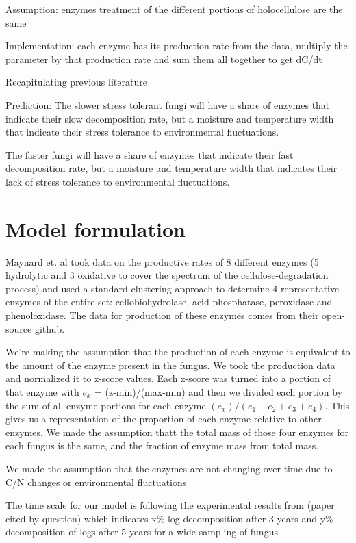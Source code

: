\documentclass[12pt]{article}
\begin{document}
\begin{multicols}{2}
Assumption: enzymes treatment of the different portions of holocellulose are the same 

Implementation: each enzyme has its production rate from the data, multiply the parameter by that production rate and sum them all together to get dC/dt

Recapitulating previous literature


Prediction:
The slower stress tolerant fungi will have a share of enzymes that indicate their slow decomposition rate, but a moisture and temperature width that indicate their stress tolerance to environmental fluctuations. 

The faster fungi will have a share of enzymes that indicate their fast decomposition rate, but a moisture and temperature width that indicates their lack of stress tolerance to environmental fluctuations.

\section{Model formulation}
Maynard et. al took data on the productive rates of 8 different enzymes (5 hydrolytic and 3 oxidative to cover the spectrum of the cellulose-degradation process) and used a standard clustering approach to determine 4 representative enzymes of the entire set: cellobiohydrolase, acid phosphatase, peroxidase and phenoloxidase. The data for production of these enzymes comes from their open-source github. 

We're making the assumption that the production of each enzyme is  equivalent to the amount of the enzyme present in the fungus. We took the production data and normalized it to z-score values. Each z-score was turned into a portion of that enzyme with $e_x$ = (z-min)/(max-min) and then we divided each portion by the sum of all enzyme portions for each enzyme $(e_x)/(e_1+e_2+e_3+e_4)$. This gives us a representation of the proportion of each enzyme relative to other enzymes. We made the assumption thatt the total mass of those four enzymes for each fungus is the same, and the fraction of enzyme mass from total mass.

We made the assumption that the enzymes are not changing over time due to C/N changes or environmental fluctuations

The time scale for our model is following the experimental results from (paper cited by question) which indicates x\% log decomposition after 3 years and y\% decomposition of logs after 5 years for a wide sampling of fungus


\end{multicols}
\end{document}
